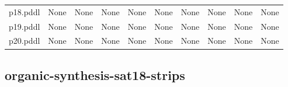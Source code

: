 \documentclass{article}
\begin{document}
\begin{tabular}{@{}lrrrrrrrrr@{}}
p18.pddl & \multicolumn{1}{|l|}{None} & \multicolumn{1}{|l|}{None} & \multicolumn{1}{|l|}{None} & \multicolumn{1}{|l|}{None} & \multicolumn{1}{|l|}{None} & \multicolumn{1}{|l|}{None} & \multicolumn{1}{|l|}{None} & \multicolumn{1}{|l|}{None} & \multicolumn{1}{|l|}{None} \\
p19.pddl & \multicolumn{1}{|l|}{None} & \multicolumn{1}{|l|}{None} & \multicolumn{1}{|l|}{None} & \multicolumn{1}{|l|}{None} & \multicolumn{1}{|l|}{None} & \multicolumn{1}{|l|}{None} & \multicolumn{1}{|l|}{None} & \multicolumn{1}{|l|}{None} & \multicolumn{1}{|l|}{None} \\
p20.pddl & \multicolumn{1}{|l|}{None} & \multicolumn{1}{|l|}{None} & \multicolumn{1}{|l|}{None} & \multicolumn{1}{|l|}{None} & \multicolumn{1}{|l|}{None} & \multicolumn{1}{|l|}{None} & \multicolumn{1}{|l|}{None} & \multicolumn{1}{|l|}{None} & \multicolumn{1}{|l|}{None} \\
\end{tabular}

\hypertarget{plan_length-organic-synthesis-sat18-strips}{}
\subsection*{organic-synthesis-sat18-strips}
\end{document}
